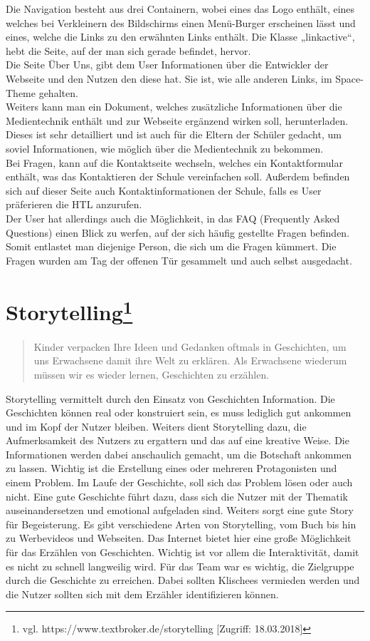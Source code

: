 Die Navigation besteht aus drei Containern, wobei eines das Logo enthält, eines welches bei Verkleinern des Bildschirms einen Menü-Burger erscheinen lässt und eines, welche die Links zu den erwähnten Links enthält. Die Klasse „linkactive“, hebt die Seite, auf der man sich gerade befindet, hervor. 
\\
Die Seite Über Uns, gibt dem User Informationen über die Entwickler der Webseite und den Nutzen den diese hat. Sie ist, wie alle anderen Links, im Space-Theme gehalten. \\
Weiters kann man ein Dokument, welches zusätzliche Informationen über die Medientechnik enthält und zur Webseite ergänzend wirken soll, herunterladen. Dieses ist sehr detailliert und ist auch für die Eltern der Schüler gedacht, um soviel Informationen, wie möglich über die Medientechnik zu bekommen.
\\
Bei Fragen, kann auf die Kontaktseite wechseln, welches ein Kontaktformular enthält, was das Kontaktieren der Schule vereinfachen soll. Außerdem befinden sich auf dieser Seite auch Kontaktinformationen der Schule, falls es User präferieren die HTL anzurufen. \\
Der User hat allerdings auch die Möglichkeit, in das FAQ (Frequently Asked Questions) einen Blick zu werfen, auf der sich häufig gestellte Fragen befinden. Somit entlastet man diejenige Person, die sich um die Fragen kümmert. Die Fragen wurden am Tag der offenen Tür gesammelt und auch selbst ausgedacht. 

\section[Storytelling]{Storytelling\protect\footnote{\label{foot:2}vgl. https://www.textbroker.de/storytelling [Zugriff: 18.03.2018]}}

\begin{quote}
Kinder verpacken Ihre Ideen und Gedanken oftmals in Geschichten, um uns Erwachsene damit ihre Welt zu erklären. Als Erwachsene wiederum müssen wir es wieder lernen, Geschichten zu erzählen.
\end{quote}
Storytelling vermittelt durch den Einsatz von Geschichten Information. Die Geschichten können real oder konstruiert sein, es muss lediglich gut ankommen und im Kopf der Nutzer bleiben. Weiters dient Storytelling dazu, die Aufmerksamkeit des Nutzers zu ergattern und das auf eine kreative Weise. Die Informationen werden dabei anschaulich gemacht, um die Botschaft ankommen zu lassen. Wichtig ist die Erstellung eines oder mehreren Protagonisten und einem Problem. Im Laufe der Geschichte, soll sich das Problem lösen oder auch nicht. Eine gute Geschichte führt dazu, dass sich die Nutzer mit der Thematik auseinandersetzen und emotional aufgeladen sind. Weiters sorgt eine gute Story für Begeisterung. Es gibt verschiedene Arten von Storytelling, vom Buch bis hin zu Werbevideos und Webseiten. Das Internet bietet hier eine große Möglichkeit für das Erzählen von Geschichten. Wichtig ist vor allem die Interaktivität, damit es nicht zu schnell langweilig wird.  Für das Team war es wichtig, die Zielgruppe durch die Geschichte zu erreichen. Dabei sollten Klischees vermieden werden und die Nutzer sollten sich mit dem Erzähler identifizieren können. 

